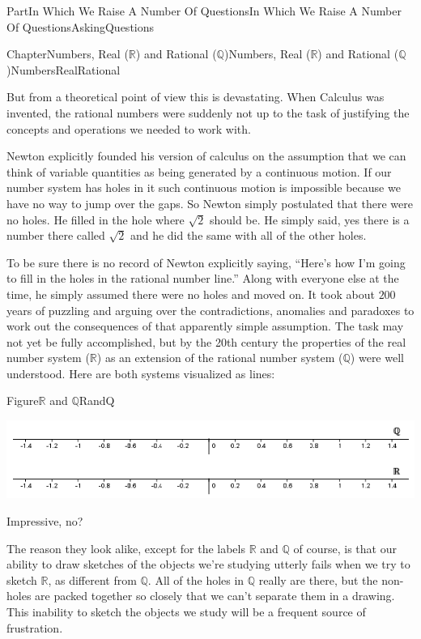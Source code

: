\documentclass[oneside,10pt,]{book}
\numberwithin{equation}{part}
\newcommand{\RR}{\mathbb {R}}
\newcommand{\QQ}{\mathbb {Q}}
\begin{document}
\begin{partptx}{Part}{In Which We Raise A Number Of Questions}{}{In Which We Raise A Number Of Questions}{}{}{AskingQuestions}
\begin{chapterptx}{Chapter}{Numbers, Real (\(\RR\)) and Rational (\(\QQ\))}{}{Numbers, Real (\(\RR\)) and Rational (\(\QQ\))}{}{}{NumbersRealRational}
\begin{introduction}{}
But from a theoretical point of view this is devastating.  When Calculus was invented, the rational numbers were suddenly not up to the task of justifying the concepts and operations we needed to work with.%
\par
Newton explicitly founded his version of calculus on the assumption that we can think of variable quantities as being generated by a continuous motion.  If our number system has holes in it such continuous motion is impossible because we have no way to jump over the gaps.  So Newton simply postulated that there were no holes.  He filled in the hole where \(\sqrt{2}\) should be.  He simply said, yes there is a number there called \(\sqrt{2}\) and he did the same with all of the other holes.%
\par
To be sure there is no record of Newton explicitly saying, ``Here's how I'm going to fill in the holes in the rational number line.'' Along with everyone else at the time, he simply assumed there were no holes and moved on.  It took about \(200\) years of puzzling and arguing over the contradictions, anomalies and paradoxes to work out the consequences of that apparently simple assumption.  The task may not yet be fully accomplished, but by the 20th century the properties of the real number system (\(\RR\)) as an extension of the rational number system (\(\QQ\)) were well understood.  Here are both systems visualized as lines:%
\begin{figureptx}{Figure}{\(\RR\) and \(\QQ\)}{RandQ}{}%
\begin{image}{0}{1}{0}{}%
\includegraphics[width=\linewidth]{external/images/RandQ.png}
\end{image}%
\tcblower
\end{figureptx}%
Impressive, no?%
\par
The reason they look alike, except for the labels \(\RR\) and \(\QQ\) of course, is that our ability to draw sketches of the objects we're studying utterly fails when we try to sketch \(\RR\), as different from \(\QQ\).  All of the holes in \(\QQ\) really are there, but the non-holes are packed together so closely that we can't separate them in a drawing. This inability to sketch the objects we study will be a frequent source of frustration.%

\end{introduction}
\end{chapterptx}
\end{partptx}
\end{document}

